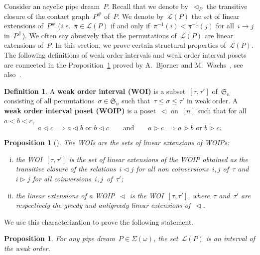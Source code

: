 \documentclass{amsart}
\newtheorem{proposition}[theorem]{Proposition}
\theoremstyle{definition}
\newtheorem{definition}[theorem]{Definition}
\newcommand{\ie}{\textit{i.e.}~} %
\newcommand{\defn}[1]{\textbf{\textsf{\color{PineGreen} #1}}} %
\newcommand{\fS}{\mathfrak{S}} %
\newcommand{\contact}{^\#} %
\newcommand{\acyclicPipeDreams}{\Sigma} %
\newcommand{\linearExtensions}{\mathcal{L}} %
\newcommand{\less}{\vartriangleleft} %
\newcommand{\more}{\vartriangleright} %
\newcommand{\contactLess}[1]{\less_{#1}} %
\begin{document}
Consider an acyclic pipe dream~$P$. Recall that we denote by~$\contactLess{P}$ the transitive closure of the contact graph~$P\contact$ of~$P$. We denote by~$\linearExtensions(P)$ the set of linear extensions of~$P\contact$ (\ie $\pi \in \linearExtensions(P)$ if and only if~$\pi^{-1}(i) < \pi^{-1}(j)$ for all~$i \to j$ in~$P\contact$). We often say abusively that the permutations of~$\linearExtensions(P)$ are linear extensions of~$P$. In this section, we prove certain structural properties of~$\linearExtensions(P)$. The following definitions of weak order intervals and weak order interval posets are connected in the Proposition~\ref{prop:WOIP} proved by A.~Bjorner and M.~Wachs~\cite{BjornerWachs}, see also~\cite{ChatelPilaudPons}.

\begin{definition}
\label{def:WOIP}
A \defn{weak order interval (WOI)} is a subset~$[\tau, \tau']$ of~$\fS_n$ consisting of all permutations~$\sigma \in \fS_n$ such that~$\tau \le \sigma \le \tau'$ in weak order. A \defn{weak order interval poset (WOIP)} is a poset~$\less$ on~$[n]$ such that for all~$a < b < c$,
\[
a \less c \implies a \less b \text{ or } b \less c 
\qquad\text{and}\qquad
a \more c \implies a \more b \text{ or } b \more c.
\]
\end{definition}

\begin{proposition}[]
\label{prop:WOIP}
The WOIs are the sets of linear extensions of WOIPs:
\begin{enumerate}[(i)]
\item the WOI~$[\tau, \tau']$ is the set of linear extensions of the WOIP obtained as the transitive closure of the relations~$i \less j$ for all non coinversions~$i,j$ of~$\tau$ and~$i \more j$ for all coinversions~$i,j$~of~$\tau'$;
\item the linear extensions of a WOIP~$\less$ is the WOI~$[\tau,\tau']$, where~$\tau$ and~$\tau'$ are respectively the greedy and antigreedy linear extensions of~$\less$.
\end{enumerate}
\end{proposition}

We use this characterization to prove the following statement.

\begin{proposition}
\label{prop:intervals}
For any pipe dream~$P \in \acyclicPipeDreams(\omega)$, the set~$\linearExtensions(P)$ is an interval of the weak order.
\end{proposition}
\end{document}
